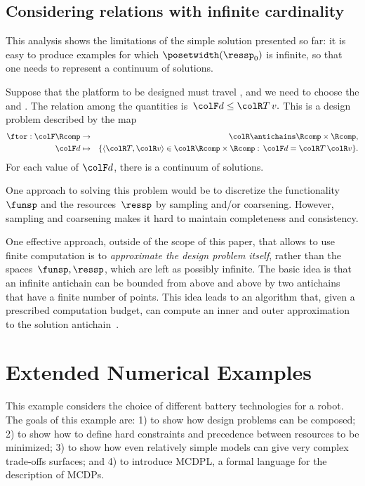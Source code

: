 \subsection{Considering relations with infinite cardinality}

This analysis shows the limitations of the simple solution presented
so far: it is easy to produce examples for which $\posetwidth(\ressp_{0})$
is infinite, so that one needs to represent a continuum of solutions.

\begin{example}
  Suppose that the platform to be designed must travel , and we need to choose the 
  and . The relation among the quantities
  is~${\colF d}\leq{\colR T\,v}.$ This is a design problem described
  by the map
  \begin{eqnarray*}
    \ftor:{\colF\Rcomp} & \rightarrow & {\colR\antichains\Rcomp\times\Rcomp,}\\
    {\colF d} & \mapsto & \{\langle{\colR T},{\colR v}\rangle\in{\colR\Rcomp\times\Rcomp}:\,{\colF d}={\colR T}\,{\colR v}\}.
  \end{eqnarray*}
  For each value of ${\colF d}$, there is a continuum of solutions.
\end{example}
One approach to solving this problem would be to discretize the functionality~$\funsp$
and the resources~$\ressp$ by sampling and/or coarsening. However,
sampling and coarsening makes it hard to maintain completeness and
consistency.

One effective approach, outside of the scope of this paper, that allows
to use finite computation is to \emph{approximate the design problem}
\emph{itself}, rather than the spaces~$\funsp,\ressp$, which are
left as possibly infinite. The basic idea is that an infinite antichain
can be bounded from above and above by two antichains that have a
finite number of points. This idea leads to an algorithm that, given
a prescribed computation budget, can compute an inner and outer approximation
to the solution antichain~\cite{mcdp_icra_uncertainty_arxiv}.

\section{Extended Numerical Examples\label{sec:Numerical-examples}}

This example considers the choice of different battery technologies
for a robot. The goals of this example are: 1) to show how design
problems can be composed; 2) to show how to define hard constraints
and precedence between resources to be minimized; 3) to show how even
relatively simple models can give very complex trade-offs surfaces;
and 4) to introduce MCDPL, a formal language for the description of
MCDPs.

